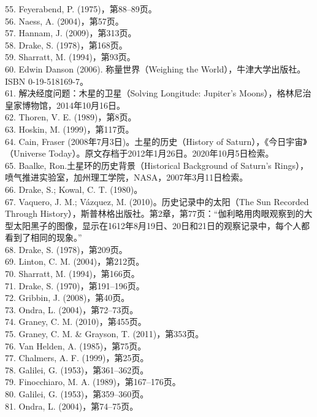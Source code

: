 55. Feyerabend, P. (1975)，第88–89页。\\
56. Naess, A. (2004)，第57页。\\
57. Hannam, J. (2009)，第313页。\\
58. Drake, S. (1978)，第168页。\\
59. Sharratt, M. (1994)，第93页。\\
60. Edwin Danson (2006). 称量世界（Weighing the World），牛津大学出版社。ISBN 0-19-518169-7。\\
61. 解决经度问题：木星的卫星（Solving Longitude: Jupiter's Moons），格林尼治皇家博物馆，2014年10月16日。\\
62. Thoren, V. E. (1989)，第8页。\\
63. Hoskin, M. (1999)，第117页。\\
64. Cain, Fraser (2008年7月3日)。土星的历史（History of Saturn），《今日宇宙》（Universe Today）。原文存档于2012年1月26日。2020年10月5日检索。\\
65. Baalke, Ron.土星环的历史背景（Historical Background of Saturn's Rings），喷气推进实验室，加州理工学院，NASA，2007年3月11日检索。\\
66. Drake, S.; Kowal, C. T. (1980)。\\
67. Vaquero, J. M.; Vázquez, M. (2010)。历史记录中的太阳（The Sun Recorded Through History），斯普林格出版社。第2章，第77页：“伽利略用肉眼观察到的大型太阳黑子的图像，显示在1612年8月19日、20日和21日的观察记录中，每个人都看到了相同的现象。” \\
68. Drake, S. (1978)，第209页。\\
69. Linton, C. M. (2004)，第212页。\\
70. Sharratt, M. (1994)，第166页。\\
71. Drake, S. (1970)，第191–196页。\\
72. Gribbin, J. (2008)，第40页。\\
73. Ondra, L. (2004)，第72–73页。\\
74. Graney, C. M. (2010)，第455页。\\
75. Graney, C. M. & Grayson, T. (2011)，第353页。\\
76. Van Helden, A. (1985)，第75页。\\
77. Chalmers, A. F. (1999)，第25页。\\
78. Galilei, G. (1953)，第361–362页。\\ 
79. Finocchiaro, M. A. (1989)，第167–176页。\\
80. Galilei, G. (1953)，第359–360页。\\
81. Ondra, L. (2004)，第74–75页。\\
